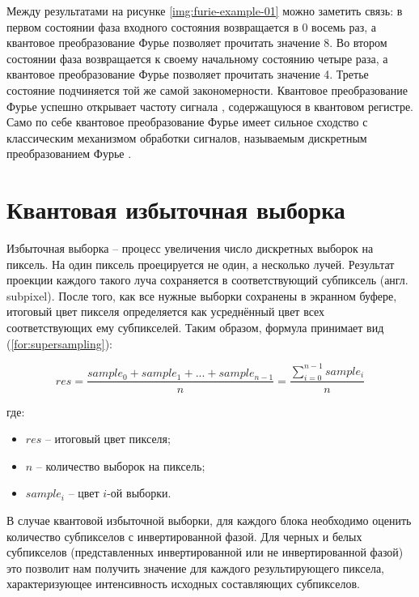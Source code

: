 Между результатами на рисунке \ref{img:furie-example-01} можно заметить связь: в первом состоянии фаза входного состояния возвращается в 0 восемь раз, а квантовое преобразование Фурье позволяет прочитать значение 8. Во втором состоянии  фаза возвращается к своему начальному состоянию четыре раза, а квантовое преобразование Фурье позволяет прочитать значение 4. Третье состояние подчиняется той же самой закономерности. Квантовое преобразование Фурье успешно открывает частоту сигнала \cite{signal}, содержащуюся в квантовом регистре. Само по себе квантовое преобразование Фурье имеет сильное сходство с классическим механизмом обработки сигналов, называемым дискретным преобразованием Фурье \cite{PQC-furie-proof}.

\section{Квантовая избыточная выборка}

Избыточная выборка -- процесс увеличения число дискретных выборок на пиксель. На один пиксель проецируется не один, а несколько лучей. Результат проекции каждого такого луча сохраняется в соответствующий субпиксель (англ. subpixel). После того, как все нужные выборки сохранены в экранном буфере, итоговый цвет пикселя определяется как усреднённый цвет всех соответствующих ему субпикселей. Таким образом, формула принимает вид (\ref{for:supersampling}): 

\begin{equation}
	\label{for:supersampling}
	res = \frac{sample_{0} + sample_{1} + ... + sample_{n-1}}{n} = \frac{\sum_{i=0}^{n - 1} sample_{i}}{n}
\end{equation}

где:

\begin{itemize}
	\item $res$ -- итоговый цвет пикселя;
	\item $n$ -- количество выборок на пиксель;
	\item $sample_{i}$ -- цвет $i$-ой выборки.
\end{itemize}

В случае квантовой избыточной выборки, для каждого блока необходимо оценить количество субпикселов с инвертированной фазой. Для черных и белых субпикселов (представленных инвертированной или не инвертированной фазой) это позволит нам получить значение для каждого результирующего пиксела, характеризующее интенсивность исходных составляющих субпикселов.

